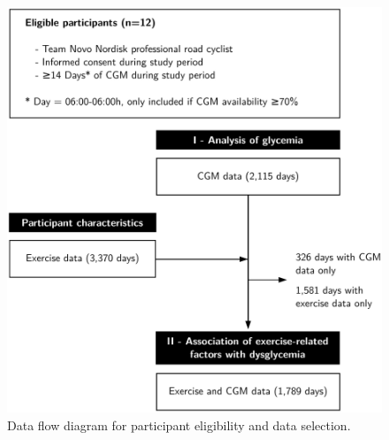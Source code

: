 \documentclass[11pt,a4paper]{article}
\begin{document}

\begin{figure}[h!]
    \centering
    \caption[Data flow diagram]{Data flow diagram for participant eligibility and data selection.}
    \label{fig:consort}
    \includegraphics[width=.8\textwidth]{figure/CONSORT_v7.pdf}
\end{figure}

\end{document}
